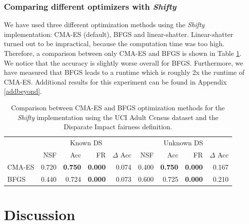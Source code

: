\subsubsection{Comparing different optimizers with \textit{Shifty}}  We have used three different optimization methods using the \textit{Shifty} implementation: CMA-ES (default), BFGS and linear-shatter. Linear-shatter turned out to be impractical, because the computation time was too high. Therefore, a comparison between only CMA-ES and BFGS is shown in Table \ref{diadultoptimizer}. We notice that the accuracy is slightly worse overall for BFGS. Furthermore, we have measured that BFGS leads to a runtime which is roughly 2x the runtime of CMA-ES. Additional results for this experiment can be found in Appendix \ref{addbeyond}.

\begin{table}[H]
\centering
\begin{tabular}{lrrrrrrrr}
\toprule
 & \multicolumn{4}{c}{Known DS} & \multicolumn{4}{c}{Unknown DS} \\
 & NSF & Acc & FR & $\Delta$ Acc & NSF & Acc & FR & $\Delta$ Acc \\
\cmidrule(r){2-5} \cmidrule{6-9}
CMA-ES & 0.720 & \bfseries 0.750 & \bfseries 0.000 & 0.074 & 0.400 & \bfseries 0.750 & \bfseries 0.000 & 0.167 \\
BFGS & 0.440 & 0.724 & \bfseries 0.000 & 0.073 & 0.600 & 0.725 & \bfseries 0.000 & 0.210 \\
\bottomrule
\end{tabular}
\caption{Comparison between CMA-ES and BFGS optimization methods for the \textit{Shifty} implementation using the UCI Adult Census dataset and the Disparate Impact fairness definition.}
\label{diadultoptimizer}
\end{table}


\section{Discussion}

